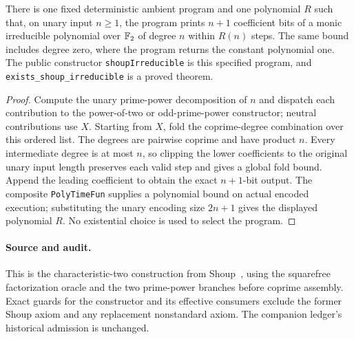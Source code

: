 \begin{lemma}
\label{lem:binary-uniform-irreducible}
\leanok
There is one fixed deterministic ambient program and one polynomial $R$ such
that, on unary input $n\geq1$, the program prints $n+1$ coefficient bits of a
monic irreducible polynomial over $\mathbb{F}_2$ of degree $n$ within $R(n)$ steps.
The same bound includes degree zero, where the program returns the constant
polynomial one. The public constructor \texttt{shoupIrreducible} is this
specified program, and \texttt{exists\_shoup\_irreducible} is a proved theorem.
\end{lemma}
\begin{proof}
\leanok
Compute the unary prime-power decomposition of $n$ and dispatch each contribution
to the power-of-two or odd-prime-power constructor; neutral contributions use
$X$. Starting from $X$, fold the coprime-degree combination over this ordered
list. The degrees are pairwise coprime and have product $n$. Every intermediate
degree is at most $n$, so clipping the lower coefficients to the original unary
input length preserves each valid step and gives a global fold bound. Append
the leading coefficient to obtain the exact $n+1$-bit output. The composite
\texttt{PolyTimeFun} supplies a polynomial bound on actual encoded execution;
substituting the unary encoding size $2n+1$ gives the displayed polynomial $R$.
No existential choice is used to select the program.
\end{proof}
\paragraph{Source and audit.} This is the characteristic-two construction from
Shoup~\cite{Sho90}, using the squarefree factorization oracle and the two
prime-power branches before coprime assembly. Exact guards for the constructor
and its effective consumers exclude the former Shoup axiom and any replacement
nonstandard axiom. The companion ledger's historical admission is unchanged.

